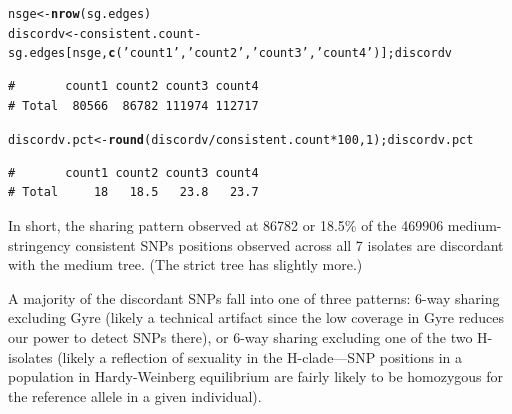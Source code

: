 \documentclass{article}\usepackage[]{graphicx}\usepackage[]{color}
\makeatletter
\newcommand{\hlnum}[1]{\textcolor[rgb]{0.686,0.059,0.569}{#1}}%
\newcommand{\hlstr}[1]{\textcolor[rgb]{0.192,0.494,0.8}{#1}}%
\newcommand{\hlopt}[1]{\textcolor[rgb]{0,0,0}{#1}}%
\newcommand{\hlstd}[1]{\textcolor[rgb]{0.345,0.345,0.345}{#1}}%
\newcommand{\hlkwb}[1]{\textcolor[rgb]{0.69,0.353,0.396}{#1}}%
\newcommand{\hlkwd}[1]{\textcolor[rgb]{0.737,0.353,0.396}{\textbf{#1}}}%
\newenvironment{kframe}{%
 \def\at@end@of@kframe{}%
 \ifinner\ifhmode%
  \def\at@end@of@kframe{\end{minipage}}%
  \begin{minipage}{\columnwidth}%
 \fi\fi%
 \def\FrameCommand##1{\hskip\@totalleftmargin \hskip-\fboxsep
 \colorbox{shadecolor}{##1}\hskip-\fboxsep
     \hskip-\linewidth \hskip-\@totalleftmargin \hskip\columnwidth}%
 \MakeFramed {\advance\hsize-\width
   \@totalleftmargin\z@ \linewidth\hsize
   \@setminipage}}%
 {\par\unskip\endMakeFramed%
 \at@end@of@kframe}
\newenvironment{knitrout}{}{} %
\makeatother
\begin{document}
\begin{knitrout}\scriptsize
{}\color{fgcolor}\begin{kframe}
\begin{alltt}
\hlstd{nsge} \hlkwb{<-} \hlkwd{nrow}\hlstd{(sg.edges)}
\hlstd{discordv} \hlkwb{<-} \hlstd{consistent.count} \hlopt{-} \hlstd{sg.edges[nsge,}\hlkwd{c}\hlstd{(}\hlstr{'count1'}\hlstd{,}\hlstr{'count2'}\hlstd{,}\hlstr{'count3'}\hlstd{,}\hlstr{'count4'}\hlstd{)] ; discordv}
\end{alltt}
\begin{verbatim}
#       count1 count2 count3 count4
# Total  80566  86782 111974 112717
\end{verbatim}
\begin{alltt}
\hlstd{discordv.pct} \hlkwb{<-} \hlkwd{round}\hlstd{(discordv}\hlopt{/}\hlstd{consistent.count}\hlopt{*}\hlnum{100}\hlstd{,}\hlnum{1}\hlstd{) ; discordv.pct}
\end{alltt}
\begin{verbatim}
#       count1 count2 count3 count4
# Total     18   18.5   23.8   23.7
\end{verbatim}
\end{kframe}
\end{knitrout}

In short, the sharing pattern observed at 86782 or 18.5\% of the 
469906 medium-stringency consistent SNPs positions observed across all 7 
isolates are discordant with the medium tree.  (The strict tree has slightly more.)  

A majority of the discordant SNPs fall into one of three patterns: 6-way sharing excluding Gyre 
(likely a technical artifact since the low coverage in Gyre reduces our power to detect SNPs there), 
or 6-way sharing excluding one of the two H-isolates (likely a reflection of sexuality in the 
H-clade---SNP positions in a population in Hardy-Weinberg equilibrium are fairly likely to be 
homozygous for the reference allele in a given individual).
\end{document}
